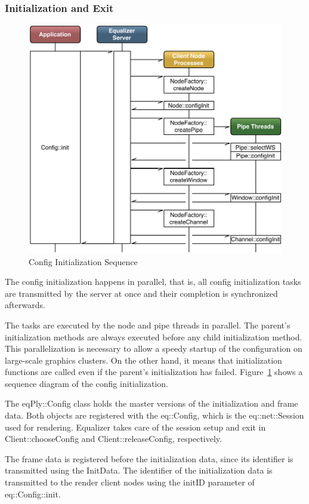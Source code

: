 \documentclass[10pt,a4]{scrartcl}
\newcommand{\fig}[1]{Figure~\ref{#1}}
\begin{document}
\subsubsection{Initialization and Exit}

\begin{figure}
  \vspace{-2ex}
  \includegraphics[width=.618\textwidth]{images/configInit.pdf}
  {\caption{\label{fConfigInit}Config Initialization Sequence}}
  \vspace{-4ex}
\end{figure}
The config initialization happens in parallel, that is, all config
initialization tasks are transmitted by the server at once and their
completion is synchronized afterwards. 

The tasks are executed by the node and pipe threads in parallel. The
parent's initialization methods are always executed before any child
initialization method. This parallelization is necessary to allow a
speedy startup of the configuration on large-scale graphics clusters. On
the other hand, it means that initialization functions are called even
if the parent's initialization has failed. \fig{fConfigInit} shows a
sequence diagram of the config initialization.

The \textsf{eqPly::Config} class holds the master versions of the
initialization and frame data. Both objects are registered with the
\textsf{eq::Config}, which is the \textsf{eq::net::Session} used for
rendering. Equalizer takes care of the session setup and exit in
\textsf{Client::choose\-Config} and \textsf{Client::releaseConfig},
respectively.

The frame data is registered before the initialization data, since its
identifier is transmitted using the \textsf{InitData}. The identifier of
the initialization data is transmitted to the render client nodes using
the \textsf{initID} parameter of \textsf{eq::Config::init}.
\end{document}
